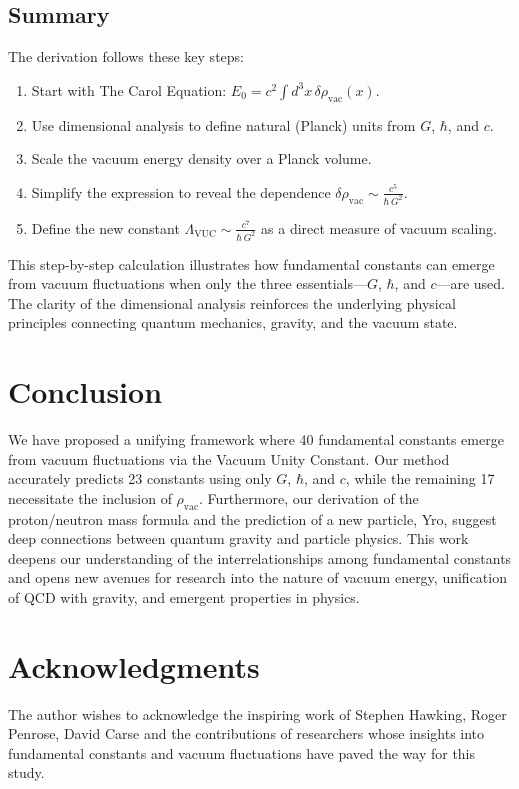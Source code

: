 \documentclass[12pt]{article}
\begin{document}
\subsection{Summary}
The derivation follows these key steps:
\begin{enumerate}
    \item Start with The Carol Equation: \(E_0 = c^2 \int d^3x\, \delta \rho_{\text{vac}}(x)\).
    \item Use dimensional analysis to define natural (Planck) units from \(G\), \(\hbar\), and \(c\).
    \item Scale the vacuum energy density over a Planck volume.
    \item Simplify the expression to reveal the dependence \(\delta \rho_{\text{vac}} \sim \frac{c^5}{\hbar\, G^2}\).
    \item Define the new constant \(\Lambda_{\text{VUC}} \sim \frac{c^7}{\hbar\, G^2}\) as a direct measure of vacuum scaling.
\end{enumerate}
This step-by-step calculation illustrates how fundamental constants can emerge from vacuum fluctuations when only the three essentials—\(G\), \(\hbar\), and \(c\)—are used. The clarity of the dimensional analysis reinforces the underlying physical principles connecting quantum mechanics, gravity, and the vacuum state.

\section{Conclusion}
We have proposed a unifying framework where 40 fundamental constants emerge from vacuum fluctuations via the Vacuum Unity Constant. Our method accurately predicts 23 constants using only \(G\), \(\hbar\), and \(c\), while the remaining 17 necessitate the inclusion of \(\rho_{\text{vac}}\). Furthermore, our derivation of the proton/neutron mass formula and the prediction of a new particle, Yro, suggest deep connections between quantum gravity and particle physics. This work deepens our understanding of the interrelationships among fundamental constants and opens new avenues for research into the nature of vacuum energy, unification of QCD with gravity, and emergent properties in physics.

\section*{Acknowledgments}
The author wishes to acknowledge the inspiring work of Stephen Hawking, Roger Penrose, David Carse and the contributions of researchers whose insights into fundamental constants and vacuum fluctuations have paved the way for this study.
\end{document}
